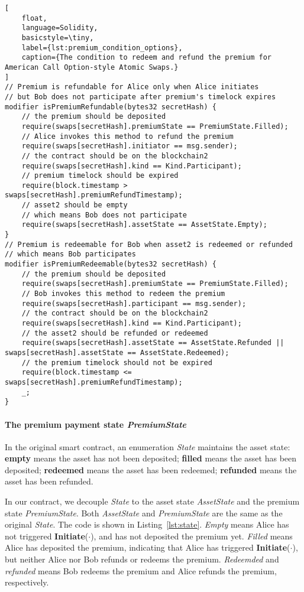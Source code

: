 \begin{lstlisting}[
    float,
    language=Solidity, 
    basicstyle=\tiny,
    label={lst:premium_condition_options},
    caption={The condition to redeem and refund the premium for American Call Option-style Atomic Swaps.}
]
// Premium is refundable for Alice only when Alice initiates
// but Bob does not participate after premium's timelock expires
modifier isPremiumRefundable(bytes32 secretHash) {
    // the premium should be deposited
    require(swaps[secretHash].premiumState == PremiumState.Filled);
    // Alice invokes this method to refund the premium
    require(swaps[secretHash].initiator == msg.sender);
    // the contract should be on the blockchain2
    require(swaps[secretHash].kind == Kind.Participant);
    // premium timelock should be expired
    require(block.timestamp > swaps[secretHash].premiumRefundTimestamp);
    // asset2 should be empty
    // which means Bob does not participate
    require(swaps[secretHash].assetState == AssetState.Empty);
}
// Premium is redeemable for Bob when asset2 is redeemed or refunded
// which means Bob participates
modifier isPremiumRedeemable(bytes32 secretHash) {
    // the premium should be deposited
    require(swaps[secretHash].premiumState == PremiumState.Filled);
    // Bob invokes this method to redeem the premium
    require(swaps[secretHash].participant == msg.sender);
    // the contract should be on the blockchain2
    require(swaps[secretHash].kind == Kind.Participant);
    // the asset2 should be refunded or redeemed
    require(swaps[secretHash].assetState == AssetState.Refunded || swaps[secretHash].assetState == AssetState.Redeemed);
    // the premium timelock should not be expired
    require(block.timestamp <= swaps[secretHash].premiumRefundTimestamp);
    _;
}
\end{lstlisting}


\paragraph{The premium payment state \textit{PremiumState}}

In the original smart contract, an enumeration \textit{State} maintains the asset state:
\textbf{empty} means the asset has not been deposited;
\textbf{filled} means the asset has been deposited;
\textbf{redeemed} means the asset has been redeemed;
\textbf{refunded} means the asset has been refunded.

In our contract, we decouple \textit{State} to the asset state \textit{AssetState} and the premium state \textit{PremiumState}.
Both \textit{AssetState} and \textit{PremiumState} are the same as the original \textit{State}.
The code is shown in Listing~\ref{lst:state}.
\textit{Empty} means Alice has not triggered \textbf{Initiate}($\cdot$), and has not deposited the premium yet.
\textit{Filled} means Alice has deposited the premium, indicating that Alice has triggered \textbf{Initiate}($\cdot$), but neither Alice nor Bob refunds or redeems the premium.
\textit{Redeemded} and \textit{refunded} means Bob redeems the premium and Alice refunds the premium, respectively.

